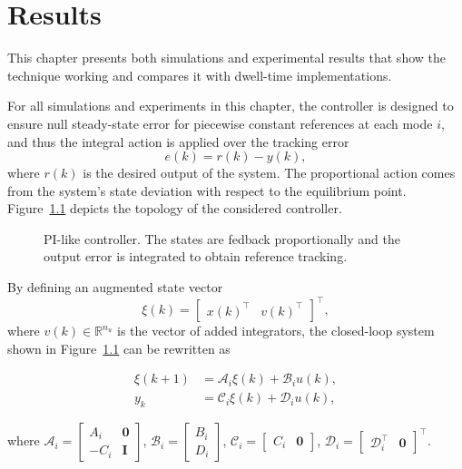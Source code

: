 
\chapter{Results}%
\label{chp:results}

This chapter presents both simulations and experimental results that show the
technique working and compares it with dwell-time implementations.

For all simulations and experiments in this chapter, the controller is designed
to ensure null steady-state error for piecewise constant references at each mode
\(i\), and thus the integral action is applied over the tracking
error~\parencite{lopes.leite.ea:anti-windup}
%
\begin{equation}
  \label{eq:r-y-error}
  e(k) = r(k)-y(k),
\end{equation}
%
where \(r(k)\) is the desired output of the system. The proportional action
comes from the system's state deviation with respect to the equilibrium point.
Figure~\ref{fig:pi-controller-diagram} depicts the topology of the considered
controller.

\begin{figure}[!htb]
  \centering
  \resizebox{0.98\linewidth}{!}{}
  \caption[PI-like controller.]{PI-like controller. The states are fedback
    proportionally and the output error is integrated to obtain reference
    tracking.}%
  \label{fig:pi-controller-diagram}
\end{figure}

By defining an augmented state vector
\[
  \xi(k)=\begin{bmatrix}{x(k)}^\top &v{(k)}^\top\end{bmatrix}^\top,
\]
where \(v(k)\in\mathbb{R}^{n_u}\) is the vector of added integrators, the
closed-loop system shown in Figure~\ref{fig:pi-controller-diagram} can be
rewritten as

\begin{equation}
  \label{sistemaaum}
  \begin{split}
    \xi(k+1) &= \mathcal{A}_i\xi(k)+\mathcal{B}_{i}u(k), \\
    y_{k}    &= \mathcal{C}_i\xi(k)+\mathcal{D}_{i}u(k),
  \end{split}
\end{equation}

where \(\mathcal{A}_i=\begin{bmatrix}A_i & \textbf{0} \\-C_{i}&\textbf{I}
\end{bmatrix} \), \(\mathcal{B}_i=\begin{bmatrix}B_i\\D_i\end{bmatrix}\),
\(\mathcal{C}_i=\begin{bmatrix} C_i & \textbf{0} \end{bmatrix}\),
\(\mathcal{D}_i=\begin{bmatrix}\mathcal{D}_i^\top&\textbf{0}\end{bmatrix}^\top\).


